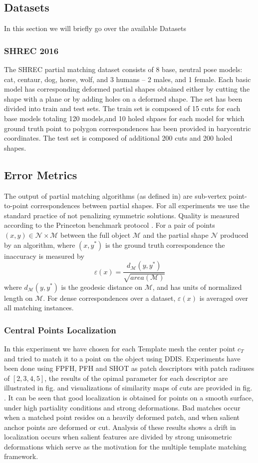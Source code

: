 \documentclass[10pt,twocolumn,letterpaper]{article}
\begin{document}
\subsection{Datasets}
In this section we will briefly go over the available Datasets
\subsubsection{SHREC 2016}  
The SHREC partial matching dataset consists of 8 base, neutral pose models: cat, centaur, dog, horse, wolf, and 3 humans – 2 males, and 1 female. Each basic model has corresponding deformed partial shapes obtained either by cutting the shape with a plane or by adding holes on a deformed shape. The set has been divided into train and test sets. The train set is composed of 15 cuts for each base models totaling 120 models,and 10 holed shpaes for each model for which ground truth point to polygon correspondences has been provided in barycentric coordinates. The test set is composed of additional 200 cuts and 200 holed shapes.


\subsection{Error Metrics}
The output of partial matching algorithms (as defined in\cite{cosmo2016shrec}) are sub-vertex point-to-point correspondences between partial shapes.
For all experiments we use the standard practice of not penalizing symmetric solutions. Quality is measured according to the Princeton benchmark protocol \cite{kim2011blended}. For a pair of points $(x,y)\in \mathcal{N}\times \mathcal{M}$ between the full object $\mathcal{M}$ and the partial shape $\mathcal{N}$ produced by an algorithm, where $(x,y^*)$ is the ground truth correspondence the inaccuracy is measured by 
\begin{equation}
\varepsilon(x)=\frac{d_{\mathcal{M}}(y,y^*)}{\sqrt{area(\mathcal{M})}}
\end{equation}
where $d_{\mathcal{M}}(y,y^*)$ is the geodesic distance on $\mathcal{M}$, and has units of normalized length on $\mathcal{M}$. For dense correspondences over a dataset, $\varepsilon(x)$ is averaged over all matching instances.
\subsubsection{Central Points Localization}
In this experiment we have chosen for each Template mesh the center point $c_T$ and tried to match it to a point on the object using DDIS. Experiments have been done using FPFH, PFH and SHOT as patch descriptors with patch radiuses of $[2,3,4,5]$, the results of the opimal parameter for each descriptor are illustrated in fig. and visualizations of similarity maps of cuts are provided in fig. . It can be seen that good localization is obtained for points on a smooth surface, under high partiality conditions and strong deformations. Bad matches occur when a matched point resides on a heavily deformed patch, and when salient anchor points are deformed or cut.  Analysis of these results shows a drift in localization occurs when salient features are divided by strong unisometric deformations which serve as the motivation for the multiple template matching framework.
\end{document}
